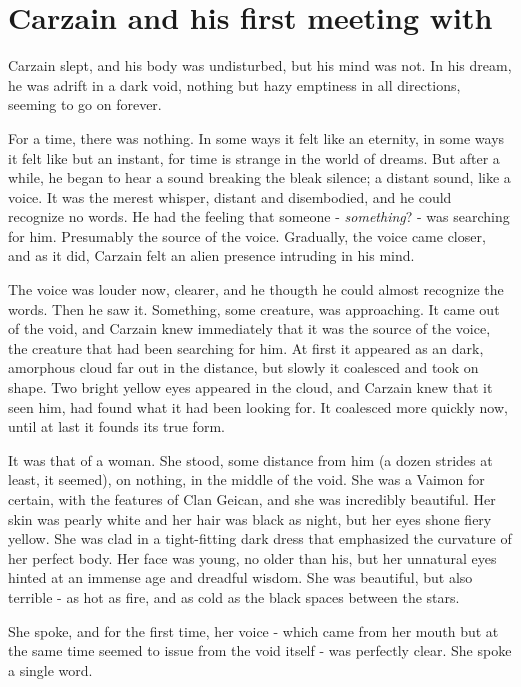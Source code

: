\section{Carzain and his first meeting with \Belzhir}
Carzain slept, and his body was undisturbed, but his mind was not. In his dream, he was adrift in a dark void, nothing but hazy emptiness in all directions, seeming to go on forever. 

For a time, there was nothing. In some ways it felt like an eternity, in some ways it felt like but an instant, for time is strange in the world of dreams. But after a while, he began to hear a sound breaking the bleak silence; a distant sound, like a voice. It was the merest whisper, distant and disembodied, and he could recognize no words. He had the feeling that someone - \emph{something}? - was searching for him. Presumably the source of the voice. Gradually, the voice came closer, and as it did, Carzain felt an alien presence intruding in his mind. 

The voice was louder now, clearer, and he thougth he could almost recognize the words. Then he saw it. Something, some creature, was approaching. It came out of the void, and Carzain knew immediately that it was the source of the voice, the creature that had been searching for him. At first it appeared as an dark, amorphous cloud far out in the distance, but slowly it coalesced and took on shape. Two bright yellow eyes appeared in the cloud, and Carzain knew that it seen him, had found what it had been looking for. It coalesced more quickly now, until at last it founds its true form. 

It was that of a woman. She stood, some distance from him (a dozen strides at least, it seemed), on nothing, in the middle of the void. She was a Vaimon for certain, with the features of Clan Geican, and she was incredibly beautiful. Her skin was pearly white and her hair was black as night, but her eyes shone fiery yellow. She was clad in a tight-fitting dark dress that emphasized the curvature of her perfect body. Her face was young, no older than his, but her unnatural eyes hinted at an immense age and dreadful wisdom. She was beautiful, but also terrible - as hot as fire, and as cold as the black spaces between the stars. 

She spoke, and for the first time, her voice - which came from her mouth but at the same time seemed to issue from the void itself - was perfectly clear. She spoke a single word. 


